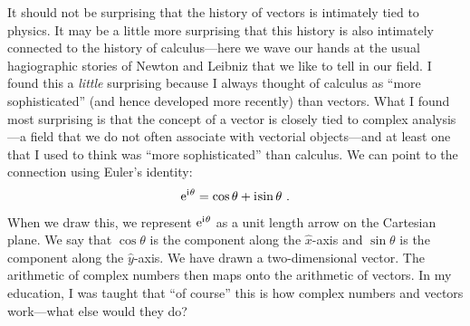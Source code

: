 \begin{subappendices}
It should not be surprising that the history of vectors is intimately tied to physics. It may be a little more surprising that this history is also intimately connected to the history of calculus---here we wave our hands at the usual hagiographic stories of Newton and Leibniz that we like to tell in our field. I found this a \emph{little} surprising because I always thought of calculus as ``more sophisticated'' (and hence developed more recently) than vectors. What I found most surprising is that the concept of a vector is closely tied to complex analysis---a field that we do not often associate with vectorial objects---and at least one that I used to think was ``more sophisticated'' than calculus. We can point to the connection using Euler's identity:
\begin{align}
    \operatorname{e}^{\operatorname{i}\mkern-2mu\theta}  = \cos\theta + \operatorname{i}\mkern-2mu \sin\theta \ .
\end{align}
When we draw this, we represent $\operatorname{e}^{\operatorname{i}\mkern-2mu \theta}$ as a unit length arrow on the Cartesian plane. We say that $\cos\theta$ is the component along the $\hat x$-axis and $\sin\theta$ is the component along the $\hat y$-axis. We have drawn a two-dimensional vector. The arithmetic of complex numbers then maps onto the arithmetic of vectors. In my education, I was taught that ``of course'' this is how complex numbers and vectors work---what else would they do?


\end{subappendices}
